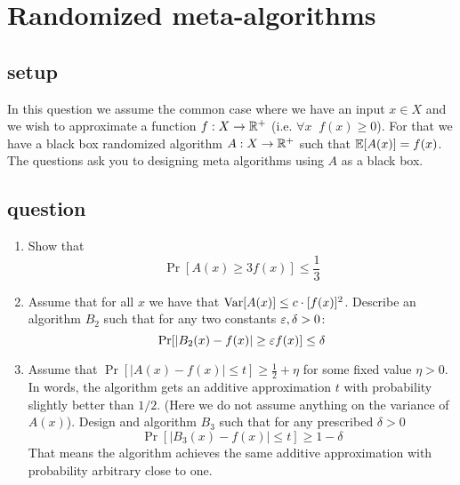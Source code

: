 \documentclass{article}
\begin{document}

\section{Randomized meta-algorithms}
\subsection*{setup}
In this question we assume the common case where we have an input $x \in X$  
and we wish to approximate a function $f:X \rightarrow {\mathbb{R}}^+$ (i.e. $\forall x\;\;f(x) \ge 0$).
For that we have a black box randomized algorithm $A:X\rightarrow {\mathbb{R}}^+$ such that ${\mathbb E}[A(x)] = f(x)$.
The questions ask you to designing meta algorithms using $A$ as a black box. 
\subsection*{question}
\begin{enumerate}
\item Show that
\[
\Pr[A(x) \ge 3f(x)] \le \frac{1}{3}
\]
\item Assume that for all $x$ we have that ${\operatorname{Var}}[A(x)] \le c\cdot [f(x)]^2$.
Describe an algorithm $B_2$ such that for any two constants $\varepsilon,\delta > 0$:
\[
\Pr[|B_2(x) - f(x)| \ge \varepsilon f(x)] \le \delta
\]
\item Assume that $\Pr[|A(x) - f(x) | \le t] \ge \frac{1}{2}+\eta$ for some fixed value $\eta > 0$.
In words, the algorithm gets an additive approximation $t$ with probability slightly better than $1/2$.
(Here we do not assume anything on the variance of $A(x)$).
Design and algorithm $B_3$ such that for any prescribed $\delta >0$
\[
\Pr[|B_3(x) - f(x) | \le t] \ge 1 - \delta
\]
That means the algorithm achieves the same additive approximation with probability arbitrary close to one.
\end{enumerate}


\pagebreak


\newcommand{\median}{\operatorname{median}}
\end{document}
